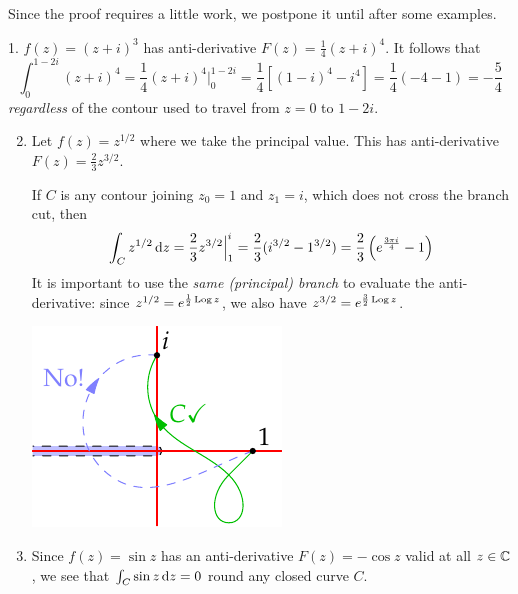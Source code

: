 Since the proof requires a little work, we postpone it until after some examples.

\begin{examples}{}{}
\hangindent\leftmargini
\textup{1. } $f(z)=(z+i)^3$ has anti-derivative $F(z)=\frac 14(z+i)^4$. It follows that
\[\int_0^{1-2i}(z+i)^4=\frac 14(z+i)^4\Big|_0^{1-2i}=\frac 14\left[(1-i)^4-i^4\right]=\frac 14(-4-1)=-\frac 54\]
\emph{regardless} of the contour used to travel from $z=0$ to $1-2i$.

\begin{enumerate}\setcounter{enumi}{1}
	\item Let $f(z)=z^{1/2}$ where we take the principal value. This has anti-derivative $F(z)=\frac 23z^{3/2}$.\par
	\begin{minipage}[t]{0.7\linewidth}\vspace{-10pt}
		If $C$ is any contour joining $z_0=1$ and $z_1=i$, which does not cross the branch cut, then
  	\[\int_Cz^{1/2}\,{\mathrm{d} z}=\frac 23z^{3/2}\Big|_1^i=\frac 23(i^{3/2}-1^{3/2})=\frac 23\left(e^{\frac{3\pi i}{4}}-1\right)\]
  	It is important to use the \emph{same (principal) branch} to evaluate the anti-derivative: since $z^{1/2}=e^{\frac 12\operatorname{Log} z}$, we also have $z^{3/2}=e^{\frac 32\operatorname{Log} z}$.
	\end{minipage}\begin{minipage}[t]{0.3\linewidth}\vspace{-10pt}
		\flushright\includegraphics{contour-branch5}
	\end{minipage}
  
  
  \item Since $f(z)=\sin z$ has an anti-derivative $F(z)=-\cos z$ valid at all $z\in\mathbb{C}$, we see that $\int_C\sin z\,{\mathrm{d} z}=0$ round any closed curve $C$.
  

\end{enumerate}
\end{examples}

